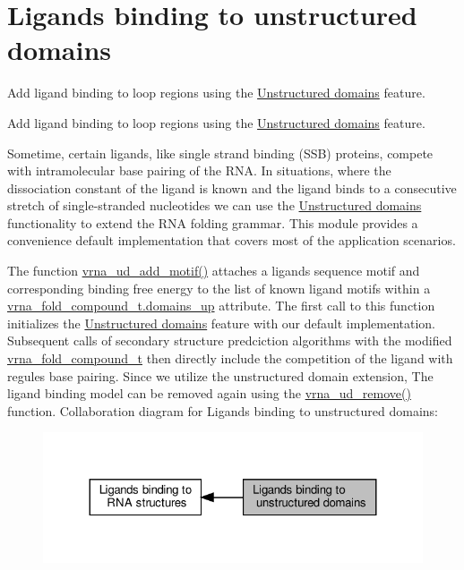 \hypertarget{group__ligands__up}{}\section{Ligands binding to unstructured domains}
\label{group__ligands__up}


Add ligand binding to loop regions using the \hyperlink{group__domains__up}{Unstructured domains} feature.  


Add ligand binding to loop regions using the \hyperlink{group__domains__up}{Unstructured domains} feature. 

Sometime, certain ligands, like single strand binding (S\+SB) proteins, compete with intramolecular base pairing of the R\+NA. In situations, where the dissociation constant of the ligand is known and the ligand binds to a consecutive stretch of single-\/stranded nucleotides we can use the \hyperlink{group__domains__up}{Unstructured domains} functionality to extend the R\+NA folding grammar. This module provides a convenience default implementation that covers most of the application scenarios.

The function \hyperlink{group__domains__up_gaec0c3313fb2951946614f920d289829a}{vrna\+\_\+ud\+\_\+add\+\_\+motif()} attaches a ligands sequence motif and corresponding binding free energy to the list of known ligand motifs within a \hyperlink{group__fold__compound_a4f70b6d32681fc8ca061236f21819ae7}{vrna\+\_\+fold\+\_\+compound\+\_\+t.\+domains\+\_\+up} attribute. The first call to this function initializes the \hyperlink{group__domains__up}{Unstructured domains} feature with our default implementation. Subsequent calls of secondary structure predciction algorithms with the modified \hyperlink{group__fold__compound_ga1b0cef17fd40466cef5968eaeeff6166}{vrna\+\_\+fold\+\_\+compound\+\_\+t} then directly include the competition of the ligand with regules base pairing. Since we utilize the unstructured domain extension, The ligand binding model can be removed again using the \hyperlink{group__domains__up_gada59cb0c498b812eadd010811af3f2d4}{vrna\+\_\+ud\+\_\+remove()} function. Collaboration diagram for Ligands binding to unstructured domains\+:
\nopagebreak
\begin{figure}[H]
\begin{center}
\leavevmode
\includegraphics[width=324pt]{group__ligands__up}
\end{center}
\end{figure}
